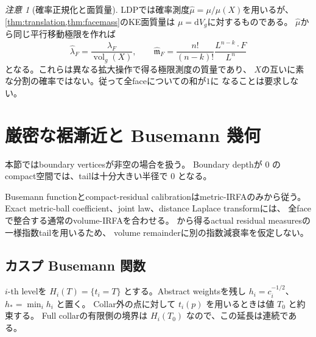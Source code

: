 \documentclass[11pt,a4paper]{ltjsarticle}
\newcommand{\dd}{\mathrm d}
\newcommand{\vol}{\operatorname{vol}}
\theoremstyle{plain}
\theoremstyle{definition}
\theoremstyle{remark}
\newtheorem{remark}[remark]{注意}
\begin{document}
\begin{remark}[確率正規化と面質量]
\label{rem:probability-face-mass}
LDPでは確率測度$\widehat\mu=\mu/\mu(X)$を用いるが、
\cref{thm:translation,thm:facemass}のKE面質量は
$\mu=\dd V_g$に対するものである。
$\widehat\mu$から同じ平行移動極限を作れば
\[
 \widehat\lambda_F=\frac{\lambda_F}{\vol_g(X)},\qquad
 \widehat{\mathfrak m}_F
 =\frac{n!}{(n-k)!}\frac{L^{n-k}\cdot F}{L^n}
\]
となる。これらは異なる拡大操作で得る極限測度の質量であり、
$X$の互いに素な分割の確率ではない。従って全faceについての和が$1$に
なることは要求しない。
\end{remark}

\section{厳密な裾漸近と Busemann 幾何}
\label{sec:tails}

本節ではboundary verticesが非空の場合を扱う。
Boundary depthが $0$ のcompact空間では、tailは十分大きい半径で $0$ となる。

Busemann functionとcompact-residual calibrationはmetric-IRFAのみから従う。
Exact metric-ball coefficient、joint law、distance Laplace transformには、
全faceで整合する通常のvolume-IRFAを合わせる。
から得るactual residual measuresの一様指数tailを用いるため、
volume remainderに別の指数減衰率を仮定しない。

\subsection{カスプ Busemann 関数}
$i$-th levelを $H_i(T)=\{t_i=T\}$ とする。Abstract weightsを残し $h_i=c_i^{-1/2}$、$h_*=\min_i h_i$ と置く。
Collar外の点に対して $t_i(p)$ を用いるときは値 $T_0$ と約束する。
Full collarの有限側の境界は $H_i(T_0)$ なので、この延長は連続である。
\end{document}
